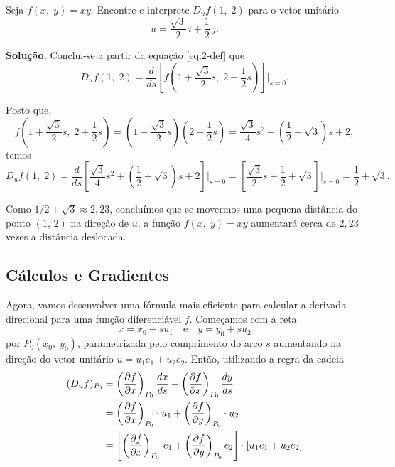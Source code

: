 \begin{exc}
	Seja \(f(x,\; y) = xy\). Encontre e interprete \(D_{u}f (1, \; 2) \) para o vetor unitário
	\begin{equation*}
		u = \frac{\sqrt{3}}{2}\, i + \frac{1}{2}\, j.
	\end{equation*}
\end{exc}

\textbf{Solução.}
Conclui-se  a partir  da equação \eqref{eq:2-def} que
\begin{equation*}
	D_{u}f(1,\; 2) =\frac{d}{ds}\left[ f\left(1+\frac{\sqrt{3}}{2}s, \; 2+\frac{1}{2}s \right) \right]\Bigg\vert_{s=0}.
\end{equation*}

Posto que,
\begin{equation*}
	f\left(1+\frac{\sqrt{3}}{2}s, \; 2+\frac{1}{2}s \right)=\left(1+\frac{\sqrt{3}}{2}s \right) \left( 2+\frac{1}{2}s\right)
	=\frac{\sqrt{3}}{4}s^{2}+\left(\frac{1}{2}+\sqrt{3} \right)s + 2,
\end{equation*}
temos
\begin{equation*}
	D_{u}f(1, \; 2) = \frac{d}{ds}\left[ \frac{\sqrt{3}}{4}s^{2}+\left(\frac{1}{2}+\sqrt{3} \right)s + 2 \right]\Bigg\vert_{s=0}=
	\left[ \frac{\sqrt{3}}{2}s+\frac{1}{2} + \sqrt{3}\right]\bigg\vert_{s=0} =\frac{1}{2} + \sqrt{3}.
\end{equation*}

Como \(1/2 + \sqrt{3} \approx 2,23\), concluímos que se movermos uma pequena distância do ponto \((1,\, 2)\) na direção de \(u\), a função
\(f(x,\; y) = xy\) aumentará cerca de \(2,23\) vezes a distância deslocada.

%
\subsection{Cálculos e Gradientes}
%

Agora, vamos desenvolver uma fórmula mais eficiente para calcular a derivada direcional para uma função diferenciável \(f\). Começamos com a reta
\begin{equation}\label{eq:2-thom}
	x=x_{0}+su_{1} \quad \text{e}\quad y=y_{0}+su_{2}
\end{equation}
por \(P_{0}(x_{0},\; y_{0})\), parametrizada pelo comprimento do arco \(s\) aumentando na direção do vetor unitário
\(u =u_{1}e_{1}+u_{2}e_{2}\). Então, utilizando a regra da cadeia
\begin{align}
	(D_{u}f)_{P_{0}} &=\left(\frac{\partial f }{\partial x}\right)_{P_{0}}\frac{dx}{ds}+\left(\frac{\partial f }{\partial
		x} \right)_{P_{0}}\frac{dy}{ds} \notag\\
	&= \left(\frac{\partial f }{\partial x} \right)_{P_{0}}\cdot u_{1}+\left(\frac{\partial f }{\partial y}
	\right)_{P_{0}}\cdot u_{2}\notag\\
	&= \left[\left(\frac{\partial f }{\partial x}\right)_{P_{0}}\,e_{1}+\left(\frac{\partial f }{\partial y}
	\right)_{P_{0}}e_{2}\right]\cdot \left[u_{1}e_{1}+u_{2}e_{2} \right] \label{eq:3-thom}
\end{align}

